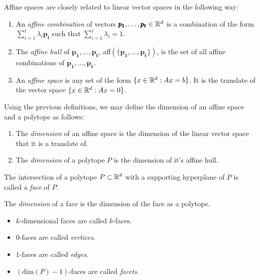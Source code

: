 \begin{definition}
    Affine spaces are closely related to linear vector spaces in the following way:
    \begin{enumerate}
        \item An \textit{affine combination} of vectors $\pmb{p_1}, \dots, \pmb{p_t} \in \mathbb{R}^d$ is a combination of the form $\sum_{i=1}^t \lambda_i \pmb{p_i}$ such that $\sum_{i=1}^t \lambda_i = 1$.
        \item The \textit{affine hull} of $\pmb{p_1}, \dots, \pmb{p_t}$, aff$(\{\pmb{p_1}, \dots, \pmb{p_t}\})$, is the set of all affine combinations of $\pmb{p_1}, \dots, \pmb{p_t}$.
        \item An \textit{affine space} is any set of the form $\lbrace x \in \mathbb{R}^d : Ax = b \rbrace$. It is the translate of the vector space $\lbrace x \in \mathbb{R}^d : Ax = 0 \rbrace$.
    \end{enumerate}
\end{definition}

\begin{definition}[Dimension]
    Using the previous definitions, we may define the dimension of an affine space and a polytope as follows:
    \begin{enumerate}
        \item The \textit{dimension} of an affine space is the dimension of the linear vector space that it is a translate of.
        \item The \textit{dimension} of a polytope $P$ is the dimension of it's affine hull.
    \end{enumerate}
\end{definition}

\begin{definition}
    The intersection of a polytope $P \subset \mathbb{R}^d$ with a supporting hyperplane of $P$ is called a \textit{face} of $P$.

    The \textit{dimension} of a face is the dimension of the face as a polytope.
    \begin{itemize}
        \item $k$-dimensional faces are called $k$-faces.
        \item $0$-faces are called \textit{vertices}.
        \item $1$-faces are called \textit{edges}.
        \item $(\text{dim}(P) - 1)$-faces are called \textit{facets}.
    \end{itemize}
\end{definition}


